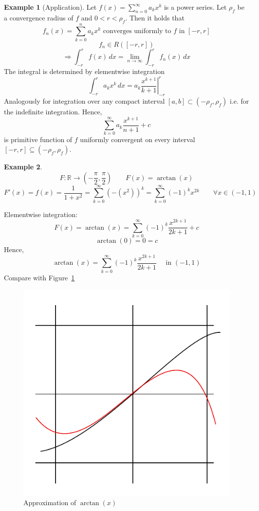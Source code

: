 \documentclass[a4paper,landscape,twocolumn]{article}
\theoremstyle{definition}
\newtheorem{ex}{Example}
\begin{document}
\begin{ex}[Application]
  Let $f(x) = \sum_{n=0}^\infty a_k x^k$ is a power series.
  Let $\rho_f$ be a convergence radius of $f$ and $0 < r < \rho_f$.
  Then it holds that
  \[ f_n(x) = \sum_{k=0}^n a_k x^k \text{ converges uniformly to $f$ in $[-r,r]$} \]
  \[ f_n \in R([-r,r]) \]
  \[
    \Rightarrow
    \int_{-r}^r f(x) \, dx
    = \lim_{n\to\infty} \int_{-r}^r f_n(x) \, dx
  \]
  The integral is determined by elementwise integration
  \[ \int_{-r}^r a_k x^k \, dx = \left. a_k \frac{x^{k+1}}{k+1} \right|_{-r}^r \]
  Analogously for integration over any compact interval $[a,b] \subset (-\rho_f, \rho_f)$
  i.e. for the indefinite integration. Hence,
  \[ \sum_{k=0}^\infty a_k \frac{x^{k+1}}{n+1} + c \]
  is primitive function of $f$ uniformly convergent on every interval
  $[-r,r] \subseteq (-\rho_f, \rho_f)$.
\end{ex}

\begin{ex}
  \[ F: \mathbb R \to \left(-\frac\pi2, \frac\pi2\right) \qquad F(x) = \arctan(x) \]
  \[
    F'(x) = f(x) = \frac{1}{1 + x^2}
    = \sum_{k=0}^\infty \left(-(x^2)\right)^k = \sum_{k=0}^\infty (-1)^k x^{2k}
    \qquad \forall x \in (-1, 1)
  \]

  Elementwise integration:
  \[ F(x) = \arctan(x) = \sum_{k=0}^\infty (-1)^k \frac{x^{2k+1}}{2k + 1} + c \]
  \[ \arctan(0) = 0 = c \]
  Hence,
  \[ \arctan(x) = \sum_{k=0}^\infty (-1)^k \frac{x^{2k+1}}{2k + 1} \quad \text{ in } (-1, 1) \]
  Compare with Figure~\ref{img:arctan-approx}
\end{ex}

\begin{figure}[!h]
  \begin{center}
    \includegraphics{img/approximation_of_arctan.pdf}
    \caption{Approximation of $\arctan(x)$}
    \label{img:arctan-approx}
  \end{center}
\end{figure}
\end{document}
